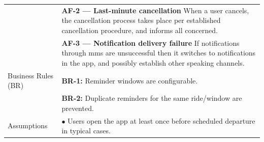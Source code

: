 \begin{longtable}{|>{\raggedright\arraybackslash}p{4cm}|>{\raggedright\arraybackslash}p{11cm}|}
& \textbf{AF-2 — Last-minute cancellation} \newline When a user cancels, the cancellation process takes place per established cancellation procedure, and informs all concerned. \\
& \textbf{AF-3 — Notification delivery failure} \newline If notifications through mms are unsuccessful then it switches to notifications in the app, and possibly establish other speaking channels. \\
\hline
Business Rules (BR) & \textbf{BR-1:} Reminder windows are configurable. \\
& \textbf{BR-2:} Duplicate reminders for the same ride/window are prevented. \\
\hline
Assumptions & $\bullet$ Users open the app at least once before scheduled departure in typical cases. \\
\end{longtable}

